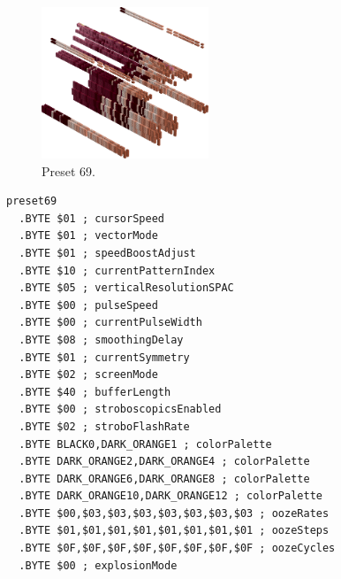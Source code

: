\clearpage
\begin{minipage}[b]{0.48\linewidth}
\begin{figure}[H]                                                          
  \centering                                                             
  \begin{adjustbox}{width=5cm,center}                                   
  \includegraphics[width=5cm]{src/colorspace_presets/preset69-45.png}%
  \end{adjustbox}                                                        
\caption*{Preset 69.}                                           
\end{figure}                                                               
\end{minipage}
\hspace{0.1cm}
\begin{minipage}[b]{0.48\linewidth}                            
\begin{lstlisting}[basicstyle=\ttfamily\tiny]
preset69
  .BYTE $01 ; cursorSpeed
  .BYTE $01 ; vectorMode
  .BYTE $01 ; speedBoostAdjust
  .BYTE $10 ; currentPatternIndex
  .BYTE $05 ; verticalResolutionSPAC
  .BYTE $00 ; pulseSpeed
  .BYTE $00 ; currentPulseWidth
  .BYTE $08 ; smoothingDelay
  .BYTE $01 ; currentSymmetry
  .BYTE $02 ; screenMode
  .BYTE $40 ; bufferLength
  .BYTE $00 ; stroboscopicsEnabled
  .BYTE $02 ; stroboFlashRate
  .BYTE BLACK0,DARK_ORANGE1 ; colorPalette
  .BYTE DARK_ORANGE2,DARK_ORANGE4 ; colorPalette
  .BYTE DARK_ORANGE6,DARK_ORANGE8 ; colorPalette
  .BYTE DARK_ORANGE10,DARK_ORANGE12 ; colorPalette
  .BYTE $00,$03,$03,$03,$03,$03,$03,$03 ; oozeRates
  .BYTE $01,$01,$01,$01,$01,$01,$01,$01 ; oozeSteps
  .BYTE $0F,$0F,$0F,$0F,$0F,$0F,$0F,$0F ; oozeCycles
  .BYTE $00 ; explosionMode
\end{lstlisting}
\end{minipage}

\vspace*{-0.5cm}

